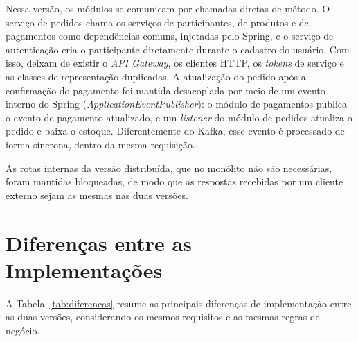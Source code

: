 Nessa versão, os módulos se comunicam por chamadas diretas de método. O serviço de pedidos chama
os serviços de participantes, de produtos e de pagamentos como dependências comuns, injetadas
pelo Spring, e o serviço de autenticação cria o participante diretamente durante o cadastro do
usuário. Com isso, deixam de existir o \textit{API Gateway}, os clientes HTTP, os
\textit{tokens} de serviço e as classes de representação duplicadas. A atualização do pedido
após a confirmação do pagamento foi mantida desacoplada por meio de um evento interno do Spring
(\textit{ApplicationEventPublisher}): o módulo de pagamentos publica o evento de pagamento
atualizado, e um \textit{listener} do módulo de pedidos atualiza o pedido e baixa o estoque.
Diferentemente do Kafka, esse evento é processado de forma síncrona, dentro da mesma requisição.

As rotas internas da versão distribuída, que no monólito não são necessárias, foram mantidas
bloqueadas, de modo que as respostas recebidas por um cliente externo sejam as mesmas nas duas
versões.

\section{Diferenças entre as Implementações}

A Tabela~\ref{tab:diferencas} resume as principais diferenças de implementação entre as duas
versões, considerando os mesmos requisitos e as mesmas regras de negócio.

